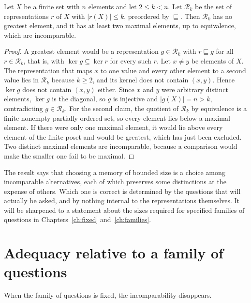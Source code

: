 \begin{newresult}\label{prop:budget}
Let $X$ be a finite set with $n$ elements and let $2\le k<n$. Let $\mathcal R_k$ be the set of representations $r$ of $X$ with $|r(X)|\le k$, preordered by $\sqsubseteq$. Then $\mathcal R_k$ has no greatest element, and it has at least two maximal elements, up to equivalence, which are incomparable.
\end{newresult}
\begin{proof}
A greatest element would be a representation $g\in\mathcal R_k$ with $r\sqsubseteq g$ for all $r\in\mathcal R_k$, that is, with $\ker g\subseteq\ker r$ for every such $r$. Let $x\ne y$ be elements of $X$. The representation that maps $x$ to one value and every other element to a second value lies in $\mathcal R_k$ because $k\ge2$, and its kernel does not contain $(x,y)$. Hence $\ker g$ does not contain $(x,y)$ either. Since $x$ and $y$ were arbitrary distinct elements, $\ker g$ is the diagonal, so $g$ is injective and $|g(X)|=n>k$, contradicting $g\in\mathcal R_k$. For the second claim, the quotient of $\mathcal R_k$ by equivalence is a finite nonempty partially ordered set, so every element lies below a maximal element. If there were only one maximal element, it would lie above every element of the finite poset and would be greatest, which has just been excluded. Two distinct maximal elements are incomparable, because a comparison would make the smaller one fail to be maximal.
\end{proof}

The result says that choosing a memory of bounded size is a choice among incomparable alternatives, each of which preserves some distinctions at the expense of others. Which one is correct is determined by the questions that will actually be asked, and by nothing internal to the representations themselves. It will be sharpened to a statement about the sizes required for specified families of questions in Chapters~\ref{ch:fixed} and~\ref{ch:families}.

\section{Adequacy relative to a family of questions}

When the family of questions is fixed, the incomparability disappears.

